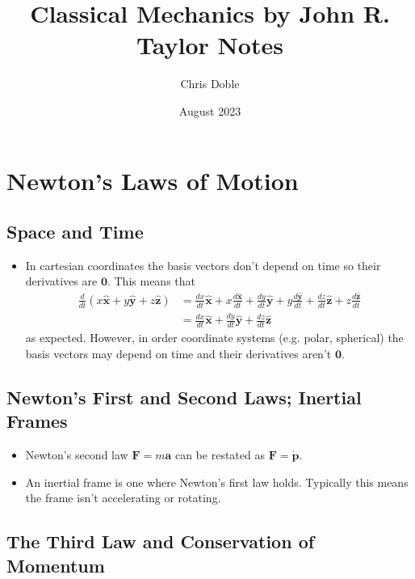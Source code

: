 \documentclass{article}
\title{Classical Mechanics by John R. Taylor Notes}
\author{Chris Doble}
\date{August 2023}
\renewcommand{\vec}[1]{\boldsymbol{\mathbf{#1}}}
\newcommand{\dvec}[1]{\dot{\vec{#1}}}
\newcommand{\uvec}[1]{\hat{\vec{#1}}}
\begin{document}
\maketitle

\tableofcontents

\section{Newton's Laws of Motion}

\setcounter{subsection}{1}
\subsection{Space and Time}

\begin{itemize}
  \item In cartesian coordinates the basis vectors don't depend on time so their derivatives are $\mathbf{0}$. This means that \begin{align*}
          \frac{d}{d t} (x \uvec{x} + y \uvec{y} + z \uvec{z}) & = \frac{d x}{d t} \uvec{x} + x \frac{d \uvec{x}}{d t} + \frac{d y}{d t} \uvec{y} + y \frac{d \uvec{y}}{d t} + \frac{d z}{d t} \uvec{z} + z \frac{d \uvec{z}}{d t} \\
                                                               & = \frac{d x}{d t} \uvec{x} + \frac{d y}{d t} \uvec{y} + \frac{d z}{d t} \uvec{z}
        \end{align*} as expected. However, in order coordinate systems (e.g. polar, spherical) the basis vectors may depend on time and their derivatives aren't $\vec{0}$.
\end{itemize}

\setcounter{subsection}{3}
\subsection{Newton's First and Second Laws; Inertial Frames}

\begin{itemize}
  \item Newton's second law $\vec{F} = m \vec{a}$ can be restated as $\vec{F} = \dvec{p}$.

  \item An inertial frame is one where Newton's first law holds. Typically this means the frame isn't accelerating or rotating.
\end{itemize}

\subsection{The Third Law and Conservation of Momentum}
\end{document}
